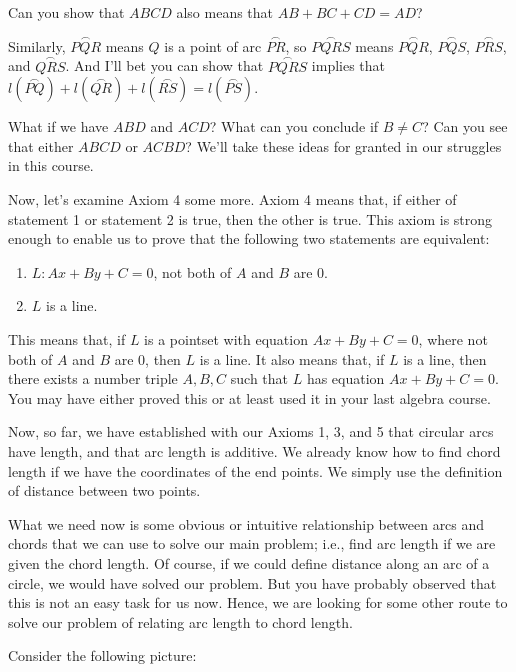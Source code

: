 \documentclass[english]{book}
\newcommand{\arc}[1]{\overset{\frown}{#1} }
\begin{document}
Can you show that $ABCD$ also means that $AB + BC + CD = AD$?

Similarly, $\arc{PQR}$ means $Q$ is a point of arc $\arc{PR}$, so $\arc{PQRS}$ means $\arc{PQR}$, $\arc{PQS}$, $\arc{PRS}$, and $\arc{QRS}$. And I'll bet you can show that $\arc{PQRS}$ implies that $l(\arc{PQ}) + l(\arc{QR}) + l(\arc{RS}) = l(\arc{PS})$. 

What if we have $ABD$ and $ACD$? What can you conclude if $B \neq C$? Can you see that either $ABCD$ or $ACBD$? We'll take these ideas for granted in our struggles in this course. 

Now, let's examine Axiom 4 some more. Axiom 4 means that, if either of statement 1 or statement 2 is true, then the other is true. This axiom is strong enough to enable us to prove that the following two statements are equivalent:
\begin{enumerate}[\hspace{1cm}1)]
  \item $L: Ax + By + C = 0$, not both of $A$ and $B$ are $0$.
  \item $L$ is a line.
\end{enumerate}

This means that, if $L$ is a pointset with equation $Ax + By + C = 0$, where not both of $A$ and $B$ are $0$, then $L$ is a line. It also means that, if $L$ is a line, then there exists a number triple $A,B,C$ such that $L$ has equation $Ax + By + C = 0$. You may have either proved this or at least used it in your last algebra course.

Now, so far, we have established with our Axioms 1, 3, and 5 that circular arcs have length, and that arc length is additive. We already know how to find chord length if we have the coordinates of the end points. We simply use the definition of distance between two points. 

What we need now is some obvious or intuitive relationship between arcs and chords that we can use to solve our main problem; i.e., find arc length if we are given the chord length. Of course, if we could define distance along an arc of a circle, we would have solved our problem. But you have probably observed that this is not an easy task for us now. Hence, we are looking for some other route to solve our problem of relating arc length to chord length.

Consider the following picture:
\end{document}
